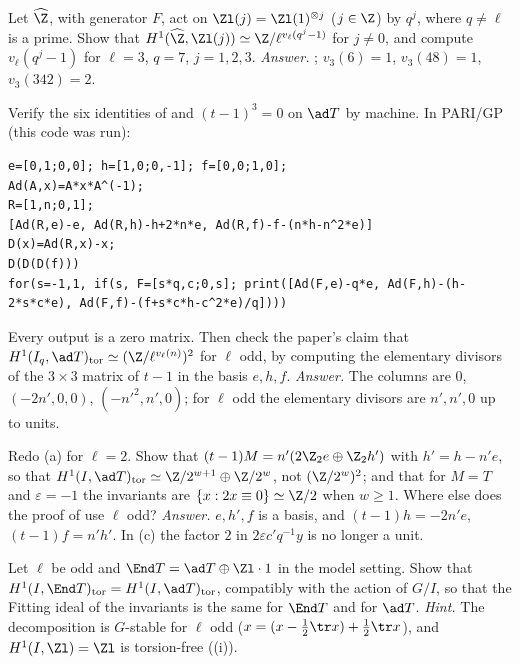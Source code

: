 \begin{exercise}\label{ex:cohomology:twists}
Let $\widehat\Z$, with generator $F$, act on $\Zl(j)=\Zl(1)^{\otimes j}$ ($j\in\Z$) by $q^j$, where $q\ne\ell$ is a prime. Show that $H^1(\widehat\Z,\Zl(j))\simeq\Z/\ell^{v_\ell(q^j-1)}$ for $j\ne0$, and
compute $v_\ell(q^j-1)$ for $\ell=3$, $q=7$, $j=1,2,3$.
\emph{Answer.} ; $v_3(6)=1$, $v_3(48)=1$, $v_3(342)=2$.
\end{exercise}

\begin{exercise}\label{ex:cohomology:identities}
Verify the six identities of  and $(t-1)^3=0$ on $\ad T$ by machine. In PARI/GP (this code was run):
\begin{lstlisting}[language=GP]
e=[0,1;0,0]; h=[1,0;0,-1]; f=[0,0;1,0];
Ad(A,x)=A*x*A^(-1);
R=[1,n;0,1];
[Ad(R,e)-e, Ad(R,h)-h+2*n*e, Ad(R,f)-f-(n*h-n^2*e)]
D(x)=Ad(R,x)-x;
D(D(D(f)))
for(s=-1,1, if(s, F=[s*q,c;0,s]; print([Ad(F,e)-q*e, Ad(F,h)-(h-2*s*c*e), Ad(F,f)-(f+s*c*h-c^2*e)/q])))
\end{lstlisting}
Every output is a zero matrix. Then check the paper's claim that $H^1(I_q,\ad T)_{\mathrm{tor}}\simeq(\Z/\ell^{v_\ell(n)})^2$ for $\ell$ odd, by computing the elementary divisors of the
$3\times3$ matrix of $t-1$ in the basis $e,h,f$.
\emph{Answer.} The columns are $0$, $(-2n',0,0)$, $(-n'^2,n',0)$; for $\ell$ odd the elementary divisors are $n',n',0$ up to units.
\end{exercise}

\begin{exercise}\label{ex:cohomology:ell2}
Redo (a) for $\ell=2$. Show that $(t-1)M=n'(2\Z_2e\oplus\Z_2h')$ with $h'=h-n'e$, so that $H^1(I,\ad T)_{\mathrm{tor}}\simeq\Z/2^{w+1}\oplus\Z/2^w$, not $(\Z/2^w)^2$; and that
for $M=T$ and $\varepsilon=-1$ the invariants are $\{x:2x\equiv0\}\simeq\Z/2$ when $w\ge1$. Where else does the proof of  use $\ell$ odd?
\emph{Answer.} $e,h',f$ is a basis, and $(t-1)h=-2n'e$, $(t-1)f=n'h'$. In (c) the factor $2$ in $2\varepsilon c'q^{-1}y$ is no longer a unit.
\end{exercise}

\begin{exercise}\label{ex:cohomology:end}
Let $\ell$ be odd and $\End T=\ad T\oplus\Zl\cdot1$ in the model setting. Show that $H^1(I,\End T)_{\mathrm{tor}}=H^1(I,\ad T)_{\mathrm{tor}}$, compatibly with the action of $G/I$, so
that the Fitting ideal of the invariants is the same for $\End T$ and for $\ad T$.
\emph{Hint.} The decomposition is $G$-stable for $\ell$ odd ($x=(x-\frac12\tr x)+\frac12\tr x$), and $H^1(I,\Zl)=\Zl$ is torsion-free ((i)).
\end{exercise}

